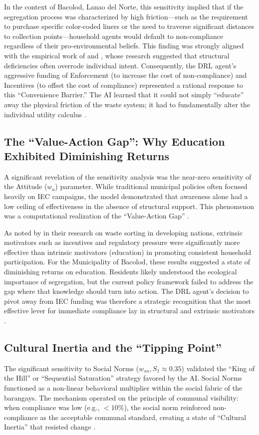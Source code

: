 In the context of Bacolod, Lanao del Norte, this sensitivity implied that if the segregation process was characterized by high friction—such as the requirement to purchase specific color-coded liners or the need to traverse significant distances to collection points—household agents would default to non-compliance regardless of their pro-environmental beliefs. This finding was strongly aligned with the empirical work of \citet{Yazawa2025} and \citet{Villanueva2021}, whose research suggested that structural deficiencies often overrode individual intent. Consequently, the DRL agent’s aggressive funding of Enforcement (to increase the cost of non-compliance) and Incentives (to offset the cost of compliance) represented a rational response to this ``Convenience Barrier.'' The AI learned that it could not simply ``educate'' away the physical friction of the waste system; it had to fundamentally alter the individual utility calculus \citep{Chen2023}.

\subsection{The ``Value-Action Gap'': Why Education Exhibited Diminishing Returns}
A significant revelation of the sensitivity analysis was the near-zero sensitivity of the Attitude ($w_a$) parameter. While traditional municipal policies often focused heavily on IEC campaigns, the model demonstrated that awareness alone had a low ceiling of effectiveness in the absence of structural support. This phenomenon was a computational realization of the ``Value-Action Gap'' \citep{Liao2024}. 

As noted by \citet{Zhao2022} in their research on waste sorting in developing nations, extrinsic motivators such as incentives and regulatory pressure were significantly more effective than intrinsic motivators (education) in promoting consistent household participation. For the Municipality of Bacolod, these results suggested a state of diminishing returns on education. Residents likely understood the ecological importance of segregation, but the current policy framework failed to address the gap where that knowledge should turn into action. The DRL agent's decision to pivot away from IEC funding was therefore a strategic recognition that the most effective lever for immediate compliance lay in structural and extrinsic motivators \citep{Badua2022}.

\subsection{Cultural Inertia and the ``Tipping Point''}
The significant sensitivity to Social Norms ($w_{sn}, S_1 \approx 0.35$) validated the ``King of the Hill'' or ``Sequential Saturation'' strategy favored by the AI. Social Norms functioned as a non-linear behavioral multiplier within the social fabric of the barangays. The mechanism operated on the principle of communal visibility: when compliance was low (e.g., $<10\%$), the social norm reinforced non-compliance as the acceptable communal standard, creating a state of ``Cultural Inertia'' that resisted change \citep{Andre2021}.


